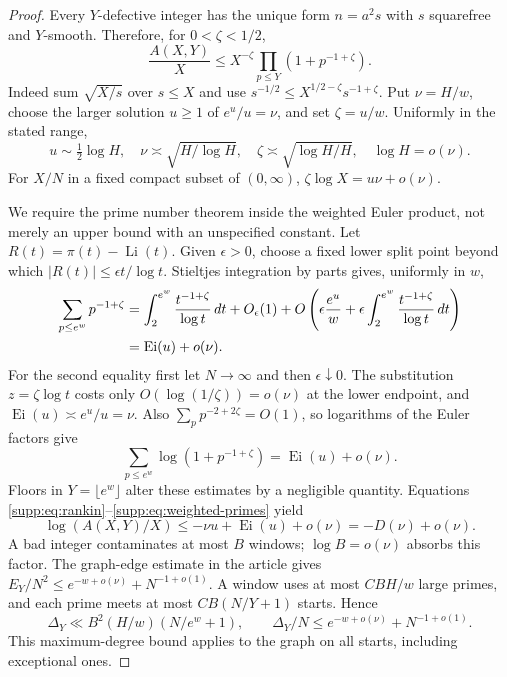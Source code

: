 \begin{proof}
Every $Y$-defective integer has the unique form $n=a^2s$ with $s$
squarefree and $Y$-smooth. Therefore, for $0<\zeta<1/2$,
\begin{equation}\label{supp:eq:rankin}
 \frac{A(X,Y)}X\le X^{-\zeta}
                         \prod_{p\le Y}(1+p^{-1+\zeta}).
\end{equation}
Indeed sum $\sqrt{X/s}$ over $s\le X$ and use
$s^{-1/2}\le X^{1/2-\zeta}s^{-1+\zeta}$.
Put $\nu=H/w$, choose the larger solution $u\ge1$ of $e^u/u=\nu$,
and set $\zeta=u/w$. Uniformly in the stated range,
\[
 u\sim\tfrac12\log H,\quad
 \nu\asymp\sqrt{H/\log H},\quad
 \zeta\asymp\sqrt{\log H/H},\quad
 \log H=o(\nu).
\]
For $X/N$ in a fixed compact subset of $(0,\infty)$,
$\zeta\log X=u\nu+o(\nu)$.

We require the prime number theorem inside the weighted Euler product,
not merely an upper bound with an unspecified constant. Let
$R(t)=\pi(t)-\operatorname{Li}(t)$. Given $\epsilon>0$, choose a fixed
lower split point beyond which $|R(t)|\le\epsilon t/\log t$.
Stieltjes integration by parts gives, uniformly in $w$,
\begin{align*}
 \sum_{p\le e^w}p^{-1+\zeta}
 &=\int_2^{e^w}\frac{t^{-1+\zeta}}{\log t}\,dt\nobreak
       +O_\epsilon(1)
       +O\left(\epsilon\frac{e^u}{w}
           +\epsilon\int_2^{e^w}\frac{t^{-1+\zeta}}{\log t}\,dt\right)\\
 &=\operatorname{Ei}(u)+o(\nu).
\end{align*}
For the second equality first let $N\to\infty$ and then
$\epsilon\downarrow0$. The substitution $z=\zeta\log t$ costs only
$O(\log(1/\zeta))=o(\nu)$ at the lower endpoint, and
$\operatorname{Ei}(u)\asymp e^u/u=\nu$. Also
$\sum_p p^{-2+2\zeta}=O(1)$, so logarithms of the Euler factors give
\begin{equation}\label{supp:eq:weighted-primes}
 \sum_{p\le e^w}\log(1+p^{-1+\zeta})
       =\operatorname{Ei}(u)+o(\nu).
\end{equation}
Floors in $Y=\lfloor e^w\rfloor$ alter these estimates by a negligible
quantity. Equations \eqref{supp:eq:rankin}--\eqref{supp:eq:weighted-primes}
yield
\[
 \log(A(X,Y)/X)\le-\nu u+\operatorname{Ei}(u)+o(\nu)
                      =-D(\nu)+o(\nu).
\]
A bad integer contaminates at most $B$ windows; $\log B=o(\nu)$ absorbs
this factor. The graph-edge estimate in the article gives
$E_Y/N^2\le e^{-w+o(\nu)}+N^{-1+o(1)}$.
A window uses at most $CBH/w$ large primes, and each prime meets at most
$CB(N/Y+1)$ starts. Hence
\begin{equation}\label{supp:eq:max-degree}
 \Delta_Y\ll B^2(H/w)(N/e^w+1),\qquad
 \Delta_Y/N\le e^{-w+o(\nu)}+N^{-1+o(1)}.
\end{equation}
This maximum-degree bound applies to the graph on all starts, including
exceptional ones.


\end{proof}
